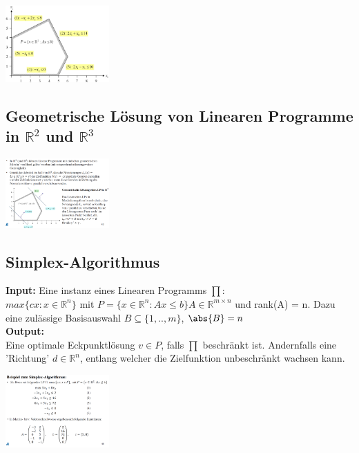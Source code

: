 \documentclass{report}
\newenvironment{Figure}
	{\par\medskip\noindent\minipage{\linewidth}}
	{\endminipage\par\medskip}
\theoremstyle{definition}
\theoremstyle{example}
\begin{document}
\begin{Figure}
\centering
\includegraphics[width=150px]{img/Polytop.png}
	\label{fig:Beispiel eines Polytops}
\end{Figure}

   \subsection{Geometrische Lösung von Linearen Programme in $\mathbb{R}^2$ und $\mathbb{R}^3$}

\begin{Figure}
\centering
\includegraphics[width=150px]{img/GeoLsgLinProg.png}
	\label{fig:Geometrische Lösung von Linearen Programme}
\end{Figure}

   \subsection{Simplex-Algorithmus}
\textbf{Input:} Eine instanz eines Linearen Programms $\prod$:\\
$max \{cx: x \in \mathbb{R}^n\}$ mit $P = \{ x \in \mathbb{R}^n: Ax \leq b \} A \in \mathbb{R}^{m \times n}$ und rank(A) = n. Dazu eine zulässige Basisauswahl $B \subseteq \{1, ..,m\}$, $\abs{B} = n$\\

\textbf{Output:}\\
 Eine optimale Eckpunktlösung $v \in P$, falls $\prod$ beschränkt ist. Andernfalls eine 'Richtung' $d \in \mathbb{R}^n$, entlang welcher die Zielfunktion unbeschränkt wachsen kann.

\begin{Figure}
\centering
\includegraphics[width=150px]{img/BspSimplexAlgorithmus.png}
	\label{fig:Beispiel zum Simplex-Algorithmus I}
\end{Figure}
\end{document}
